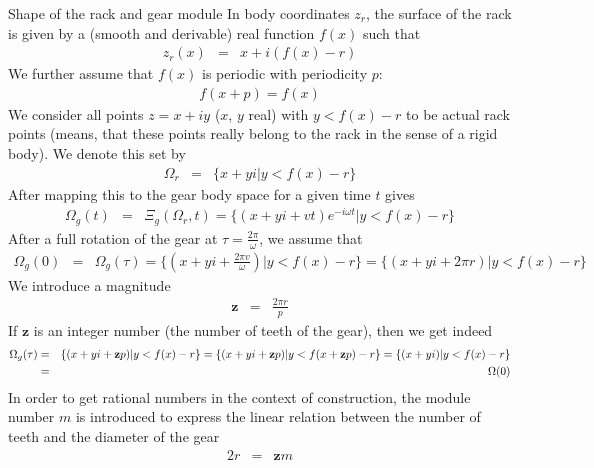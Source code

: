 \documentclass[a4paper,fleqn]{article}
\numberwithin{equation}{section}
\begin{document}
\begin{subsection}{Shape of the rack and gear module}
In body coordinates $z_r$, the surface of the rack is given by a (smooth and derivable) real function $f(x)$ such that
\begin{eqnarray}
	z_r(x) &=& x+i(f(x)-r)
\end{eqnarray}
We further assume that $f(x)$ is periodic with periodicity $p$:
\begin{eqnarray}
f(x+p) = f(x)
\end{eqnarray}
We consider all points $z=x+iy$ ($x$, $y$ real) with $y< f(x)-r$ to be actual rack points (means, that these points really belong to the rack in the sense of a rigid body). We denote this set by
\begin{eqnarray}
\Omega_r &=& \{x+yi|y< f(x)-r\}
\end{eqnarray}
After mapping this to the gear body space for a given time $t$ gives
\begin{eqnarray}
\Omega_g(t) &=& \Xi_g(\Omega_r,t) = \{(x+yi+vt)e^{-i\omega t}|y < f(x)-r\}
\end{eqnarray}
After a full rotation of the gear at $\tau=\frac{2\pi}{\omega}$, we assume that 
\begin{eqnarray}
	\Omega_g(0) &=& \Omega_g(\tau) = \{(x+yi+\frac{2\pi v}{\omega})|y< f(x)-r\}= \{(x+yi+2\pi r)|y< f(x)-r\}
\end{eqnarray}
We introduce a magnitude
\begin{eqnarray}
\mathbf{z} &=& \frac{2\pi r}{p}
\end{eqnarray}
If $\mathbf{z}$ is an integer number (the number of teeth of the gear), then we get indeed
\begin{eqnarray}
\Omega_g(\tau) &=& \{(x+yi+\mathbf{z}p)|y< f(x)-r\} = \{(x+yi+\mathbf{z}p)|y< f(x+\mathbf{z}p)-r\} = \{(x+yi)|y< f(x)-r\}\cr
&=& \Omega(0)
\end{eqnarray}
In order to get rational numbers in the context of construction, the module number $m$ is introduced to express the linear relation between the number of teeth and the diameter of the gear 
\begin{eqnarray}
	2r &=& \mathbf{z}m
\end{eqnarray}
\end{subsection}
\end{document}
